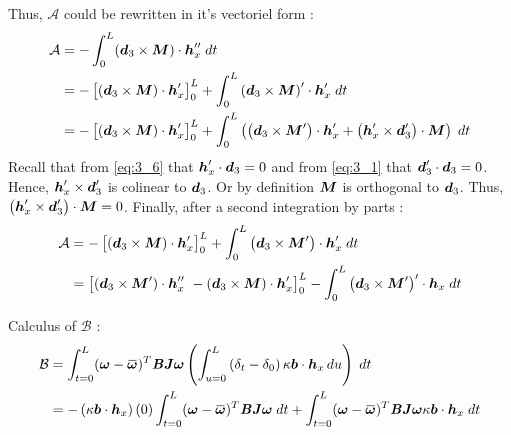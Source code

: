 
Thus,  $\mathcal{A}$ could be rewritten in it's vectoriel form :
\begin{equation}
	\begin{aligned}
	\mathcal{A}
	& = -\int_{0}^{L} ({\boldsymbol{d}_3} \times \boldsymbol{M}) \cdot \boldsymbol{h}_x'' \;dt \\
	& = -\left[\left({\boldsymbol{d}_3} \times \boldsymbol{M}\right) \cdot \boldsymbol{h}_x'\right]_0^L
		+ \int_{0}^{L} \left({\boldsymbol{d}_3} \times \boldsymbol{M}\right)'\cdot \boldsymbol{h}_x' \;dt \\
	& = -\left[\left({\boldsymbol{d}_3} \times \boldsymbol{M}\right) \cdot \boldsymbol{h}_x'\right]_0^L
		+ \int_{0}^{L} \left(
			\left({\boldsymbol{d}_3} \times \boldsymbol{M}'\right) \cdot \boldsymbol{h}_x'
			+ \left({\boldsymbol{h}'_x} \times \boldsymbol{d}_3'\right) \cdot \boldsymbol{M}
			 \right)\;dt \\
	\end{aligned}
\end{equation}
Recall that from \eqref{eq:3_6} that $\boldsymbol{h}'_x \cdot \boldsymbol{d}_3 = 0$  and from \eqref{eq:3_1} that $\boldsymbol{d}'_3 \cdot \boldsymbol{d}_3 = 0$. Hence, $\boldsymbol{h}'_x \times \boldsymbol{d}_3'$ is colinear to $\boldsymbol{d}_3$. Or by definition $\boldsymbol{M}$ is orthogonal to $\boldsymbol{d}_3$. Thus, $\left({\boldsymbol{h}'_x} \times \boldsymbol{d}_3'\right) \cdot \boldsymbol{M} = 0$.
Finally, after a second integration by parts :
\begin{equation}
	\begin{aligned}
	\mathcal{A}
	& = -\left[\left({\boldsymbol{d}_3} \times \boldsymbol{M}\right) \cdot \boldsymbol{h}_x'\right]_0^L
		+ \int_{0}^{L} \left(
			{\boldsymbol{d}_3} \times \boldsymbol{M}'\right) \cdot \boldsymbol{h}_x'
			 \;dt \\
	& = 	\left[
			({\boldsymbol{d}_3} \times \boldsymbol{M}') \cdot \boldsymbol{h}''_x\
			- ({\boldsymbol{d}_3} \times \boldsymbol{M}) \cdot \boldsymbol{h}_x'
		\right]_0^L
		- \int_{0}^{L} \left({\boldsymbol{d}_3} \times \boldsymbol{M}'\right)' \cdot \boldsymbol{h}_x \;dt \\
	\end{aligned}
\end{equation}

Calculus of $\mathcal{B}$ :
\begin{equation}
	\begin{aligned}
	\mathcal{B} &=
	\int_{t=0}^{L} (\vect{\omega} - \overbar{\vect{\omega}})^T \mat{B}\mat{J}\vect{\omega}
	\left(\int_{u=0}^L \left(\delta_t-\delta_0\right)\kappa\vect{b}\cdot  \vect{h}_x \,du\right)
	\;dt
	\\
	&=
	-\left(\kappa\vect{b}\cdot\vect{h}_x\right)(0) \int_{t=0}^{L} (\vect{\omega} - \overbar{\vect{\omega}})^T \mat{B}\mat{J}\vect{\omega}\;dt
	+
	\int_{t=0}^{L} (\vect{\omega} - \overbar{\vect{\omega}})^T \mat{B}\mat{J}\vect{\omega}
	\kappa\vect{b}\cdot\vect{h}_x
	\;dt
	\end{aligned}
\end{equation}

